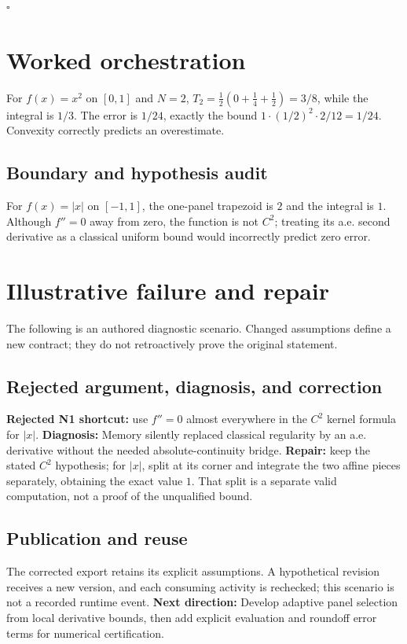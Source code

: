 \documentclass[preprint,12pt,aps,pra,showkeys,amsmath,amssymb,superscriptaddress,floatfix]{revtex4-2}
\theoremstyle{definition}
\theoremstyle{remark}
\begin{document}
\hfill$\square$

\section{Worked orchestration}

For \(f(x)=x^2\) on \([0,1]\) and \(N=2\),
\(T_2=\tfrac12(0+\tfrac14+\tfrac12)=3/8\), while the integral is
\(1/3\). The error is \(1/24\), exactly the bound
\(1\cdot(1/2)^2\cdot2/12=1/24\). Convexity correctly predicts an
overestimate.

\subsection{Boundary and hypothesis audit}

For \(f(x)=|x|\) on \([-1,1]\), the one-panel trapezoid is \(2\) and the
integral is \(1\). Although \(f''=0\) away from zero, the function is
not \(C^2\); treating its a.e. second derivative as a classical uniform
bound would incorrectly predict zero error.

\section{Illustrative failure and repair}

The following is an authored diagnostic scenario. Changed assumptions
define a new contract; they do not retroactively prove the original
statement.

\subsection{Rejected argument, diagnosis, and correction}
\textbf{Rejected N1 shortcut:} use \(f''=0\) almost everywhere in the
\(C^2\) kernel formula for \(|x|\). \textbf{Diagnosis:} Memory silently
replaced classical regularity by an a.e. derivative without the needed
absolute-continuity bridge. \textbf{Repair:} keep the stated \(C^2\)
hypothesis; for \(|x|\), split at its corner and integrate the two
affine pieces separately, obtaining the exact value \(1\). That split is
a separate valid computation, not a proof of the unqualified bound.

\subsection{Publication and reuse}
The corrected export retains its explicit assumptions. A hypothetical
revision receives a new version, and each consuming activity is
rechecked; this scenario is not a recorded runtime event. \textbf{Next
direction:} Develop adaptive panel selection from local derivative
bounds, then add explicit evaluation and roundoff error terms for
numerical certification.
\end{document}
